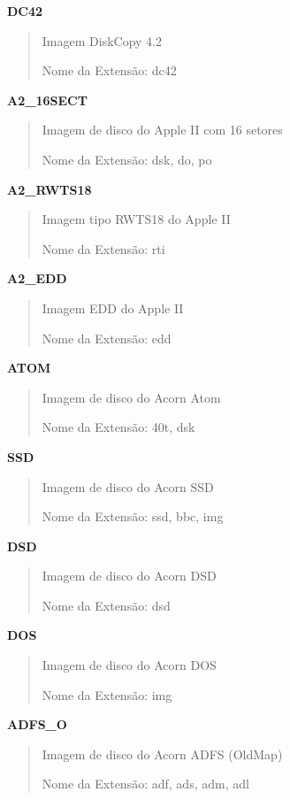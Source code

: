 \documentclass[letterpaper,10pt,brazil]{sphinxmanual}
\begin{document}
\textbf{DC42}
\begin{quote}

Imagem DiskCopy 4.2

Nome da Extensão: dc42
\end{quote}

\textbf{A2\_16SECT}
\begin{quote}

Imagem de disco do Apple II com 16 setores

Nome da Extensão: dsk, do, po
\end{quote}

\textbf{A2\_RWTS18}
\begin{quote}

Imagem tipo RWTS18 do Apple II

Nome da Extensão: rti
\end{quote}

\textbf{A2\_EDD}
\begin{quote}

Imagem EDD do Apple II

Nome da Extensão: edd
\end{quote}

\textbf{ATOM}
\begin{quote}

Imagem de disco do Acorn Atom

Nome da Extensão: 40t, dsk
\end{quote}

\textbf{SSD}
\begin{quote}

Imagem de disco do Acorn SSD

Nome da Extensão: ssd, bbc, img
\end{quote}

\textbf{DSD}
\begin{quote}

Imagem de disco do Acorn DSD

Nome da Extensão: dsd
\end{quote}

\textbf{DOS}
\begin{quote}

Imagem de disco do Acorn DOS

Nome da Extensão: img
\end{quote}

\textbf{ADFS\_O}
\begin{quote}

Imagem de disco do Acorn ADFS (OldMap)

Nome da Extensão: adf, ads, adm, adl
\end{quote}
\end{document}
